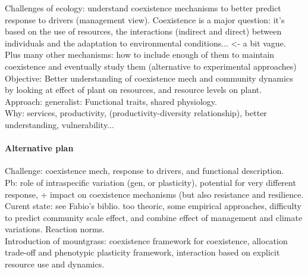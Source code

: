 \documentclass[review]{elsarticle}
\begin{document}
Challenges of ecology: understand coexistence mechanisms to better predict response to drivers (management view). Coexistence is a major question: it's based on the use of resources, the interactions (indirect and direct) between individuals and the adaptation to environmental conditions... <- a bit vague. Plus many other mechanisms: how to include enough of them to maintain coexistence and eventually study them (alternative to experimental approaches)\\
Objective: Better understanding of coexistence mech and community dynamics by looking at effect of plant on resources, and resource levels on plant.\\
Approach: generalist: Functional traits, shared physiology.\\
Why: services, productivity, (productivity-diversity relationship), better understanding, vulnerability...

\paragraph{Alternative plan}

Challenge: coexistence mech, response to drivers, and functional description.\\
Pb: role of intraspecific variation (gen, or plasticity), potential for very different response, + impact on coexistence mechanisms (but also resistance and resilience.\\
Curent state: see Fabio's biblio. too theoric, some empirical approaches, difficulty to predict community scale effect, and combine effect of management and climate variations. Reaction norms.\\
Introduction of mountgrass: coexistence framework for coexistence, allocation trade-off and phenotypic plasticity framework, interaction based on explicit resource use and dynamics.
\end{document}
